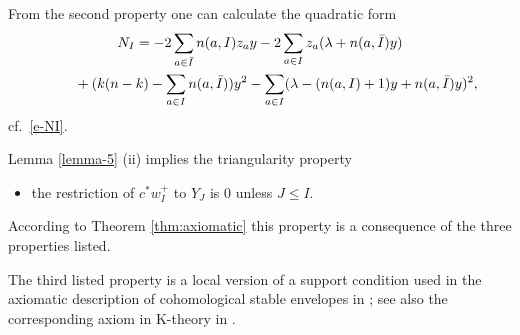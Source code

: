 \documentclass[pdftex]{sigma}
\numberwithin{equation}{section}
\begin{document}
\begin{Remark} From the second property one can calculate the quadratic form
\begin{gather*} %
 N_I =-2\sum_{a\in\bar I}n(a,I)z_ay-2\sum_{a\in I}z_a(\lambda+n(a,\bar I)y)\\
\hphantom{N_I =}{} +(k(n-k)-\sum_{a\in I}n(a,\bar I))y^2-\sum_{a\in I}(\lambda- (n(a,I)+1)y+n(a,\bar I)y)^2,
\end{gather*}
cf.~\eqref{e-NI}.
\end{Remark}

\begin{Remark}Lemma \ref{lemma-5} (ii) implies the triangularity property
\begin{itemize}\itemsep=0pt
\item the restriction of $c ^*w^+_I$ to $Y_J$ is 0 unless $J\leq I$.
\end{itemize}
According to Theorem \ref{thm:axiomatic} this property is a consequence of the three properties listed.
\end{Remark}

\begin{Remark}The third listed property is a local version of a support condition used in the axiomatic description of cohomological stable envelopes in \cite[Theorem 3.3.4(i)]{MO}; see also the corresponding axiom in K-theory in \cite[Theorem~3.1(I)]{RTV2}.
\end{Remark}
\end{document}
